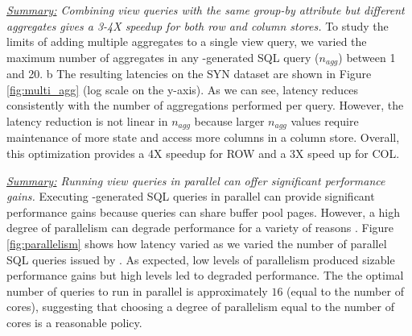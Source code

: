 {\em \underline{Summary:} Com\-bining 
view quer\-ies with the same group-by attribute
but different aggregates gives a 
3-4X speedup for both row and column stores.}
To study the limits of adding multiple aggregates to a single view query, we
varied the maximum number of aggregates in any \SeeDB-generated SQL query 
($n_{agg}$) between 1 and 20.
b%
The resulting latencies on the SYN dataset are shown in Figure \ref{fig:multi_agg} (log scale on the y-axis).
As we can see, latency reduces consistently with the number of aggregations performed 
per query.
However, the latency reduction is not linear in $n_{agg}$ because
larger $n_{agg}$ values require maintenance of more state and access more columns in a 
column store.
Overall, this optimization provides a 4X speedup for ROW and a 3X speed up for COL.

{\em \underline{Summary:} Running view queries in parallel can offer significant
performance gains.}
Executing \SeeDB-generated SQL queries in parallel can provide significant performance gains
because queries can share buffer pool pages.
However, a high degree of parallelism can degrade performance for a variety of reasons \cite{Postgres_wiki}. 
Figure \ref{fig:parallelism} shows how latency varied as we varied the number of parallel SQL queries
issued by \SeeDB.
As expected, low levels of parallelism produced sizable performance gains but
high levels led to degraded performance.  The the optimal number of queries to 
run in parallel is approximately $16$ (equal to the number of cores),
suggesting that choosing a degree of parallelism equal to the number of cores
is a reasonable policy. 



